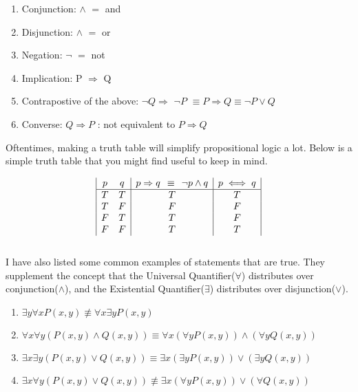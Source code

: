 \documentclass[a4paper]{article}
\begin{document}
\begin{enumerate}
	\item Conjunction: $\land$ $=$ and
	\item Disjunction: $\wedge$  $=$ or
	\item Negation: $\neg$ $=$ not
	\item Implication: P $\Rightarrow$ Q
	\item Contrapostive of the above: $\neg Q \Rightarrow$ $\neg P$ $\equiv P\Rightarrow Q \equiv \neg P \vee Q$ 
	\item Converse: $Q \Rightarrow P$ : not equivalent to $P \Rightarrow Q$ 

	
\end{enumerate}



Oftentimes, making a truth table will simplify propositional logic a lot. Below is a simple truth table that you might find useful to keep in mind.

\begin{displaymath}
\begin{array}{|c c|c|c|}
p & q & p \Rightarrow q \hspace{1ex} \equiv \hspace{1ex} \neg p \wedge q & p \iff q\\ %
\hline %
T & T & T & T\\
T & F & F & F\\
F & T & T & F\\
F & F & T & T\\
\end{array}
\end{displaymath} \\

I have also listed some common examples of statements that are true. They supplement the concept that the Universal Quantifier($\forall$) distributes over conjunction($\land$), and the Existential Quantifier($\exists$) distributes over disjunction($\vee$). 

\begin{enumerate}
	\item $\exists y \forall x P(x,y) \not\equiv \forall x \exists y P(x,y)$
	\item $\forall x \forall y (P(x,y) \land Q(x,y)) \equiv \forall x (\forall y P(x,y)) \land (\forall y Q(x,y))$
	\item $\exists x \exists y (P(x,y) \vee Q(x,y)) \equiv \exists x (\exists y P(x,y)) \vee (\exists y Q(x,y))$
	\item $\exists x \forall y (P(x,y) \vee Q(x,y)) \not\equiv \exists x (\forall y P (x , y)) \vee (\forall Q(x,y))$

\end{enumerate}
\end{document}
